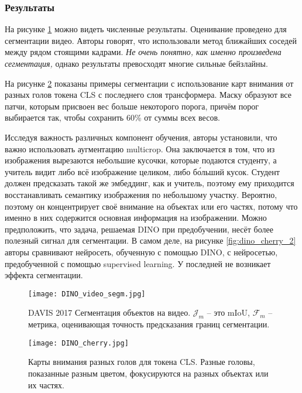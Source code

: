     \subsubsection{Результаты}
    На рисунке \ref{fig:dino_video_segm} можно видеть численные результаты.
    Оценивание проведено для сегментации видео.
    Авторы говорят, что использовали метод ближайших соседей между рядом стоящими кадрами.
    \textit{Не очень понятно, как именно произведена сегментация,} однако результаты превосходят многие сильные бейзлайны.

    На рисунке \ref{fig:dino_cherry} показаны примеры сегментации с использование карт внимания от разных голов токена CLS с последнего слоя трансформера.
    Маску образуют все патчи, которым присвоен вес больше некоторого порога, причём порог выбирается так, чтобы сохранить 60\% от суммы всех весов.

    Исследуя важность различных компонент обучения, авторы установили, что важно использовать аугментацию multicrop.
    Она заключается в том, что из изображения вырезаются небольшие кусочки, которые подаются студенту, а учитель видит либо 
    всё изображение целиком, либо б\'{о}льший кусок.
    Студент должен предсказать такой же эмбеддинг, как и учитель, поэтому ему приходится восстанавливать семантику изображения по небольшому участку.
    Вероятно, поэтому он концентрирует своё внимание на объектах или его частях, потому что именно в них содержится основная информация на изображении.
    Можно предположить, что задача, решаемая DINO при предобучении, несёт более полезный сигнал для сегментации.
    В самом деле, на рисунке \ref{fig:dino_cherry_2} авторы сравнивают нейросеть, обученную с помощью DINO, с нейросетью, предобученной с помощью  supervised learning.
    У последней не возникает эффекта сегментации. 

    \begin{figure}
        \centering
        \texttt{[image: DINO\_video\_segm.jpg]}
        \caption{DAVIS 2017 Сегментация объектов на видео.
        $\mathcal{J}_m$ -- это mIoU, $\mathcal{F}_m$ -- метрика, оценивающая точность предсказания границ сегментации.
        \label{fig:dino_video_segm}}
    \end{figure}

    \begin{figure}
        \centering
        \texttt{[image: DINO\_cherry.jpg]}
        \caption{Карты внимания разных голов для токена CLS.
        Разные головы, показанные разным цветом, фокусируются на разных объектах или их частях.
        \label{fig:dino_cherry}}
    \end{figure}

